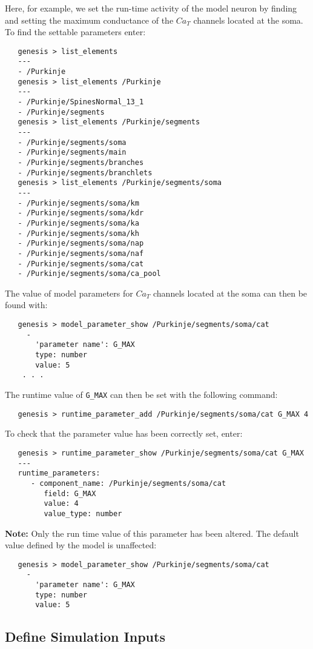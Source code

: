 \documentclass[12pt]{article}
\begin{document}
Here, for example, we set the run-time activity of the model neuron by finding and
setting the maximum conductance of the $Ca_T$ channels located at the soma. To find the settable parameters enter:
\begin{verbatim}
   genesis > list_elements
   ---
   - /Purkinje
   genesis > list_elements /Purkinje
   ---
   - /Purkinje/SpinesNormal_13_1
   - /Purkinje/segments
   genesis > list_elements /Purkinje/segments
   ---
   - /Purkinje/segments/soma
   - /Purkinje/segments/main
   - /Purkinje/segments/branches
   - /Purkinje/segments/branchlets
   genesis > list_elements /Purkinje/segments/soma
   ---
   - /Purkinje/segments/soma/km
   - /Purkinje/segments/soma/kdr
   - /Purkinje/segments/soma/ka
   - /Purkinje/segments/soma/kh
   - /Purkinje/segments/soma/nap
   - /Purkinje/segments/soma/naf
   - /Purkinje/segments/soma/cat
   - /Purkinje/segments/soma/ca_pool
\end{verbatim}
The value of model parameters for $Ca_T$ channels located at the soma can then be found with:
\begin{verbatim}
   genesis > model_parameter_show /Purkinje/segments/soma/cat
     -
       'parameter name': G_MAX
       type: number
       value: 5
    . . .  
\end{verbatim}
The runtime value of {\tt G\_MAX} can then be set with the following command:
\begin{verbatim}
   genesis > runtime_parameter_add /Purkinje/segments/soma/cat G_MAX 4
\end{verbatim}
To check that the parameter value has been correctly set, enter:
\begin{verbatim}
   genesis > runtime_parameter_show /Purkinje/segments/soma/cat G_MAX
   ---
   runtime_parameters:
      - component_name: /Purkinje/segments/soma/cat
         field: G_MAX
         value: 4
         value_type: number
\end{verbatim}
{\bf Note:} Only the run time value of this parameter has been altered. The default value defined by the model is unaffected:
\begin{verbatim}
   genesis > model_parameter_show /Purkinje/segments/soma/cat
     -
       'parameter name': G_MAX
       type: number
       value: 5
\end{verbatim}

\subsection*{Define Simulation Inputs}
\end{document}
